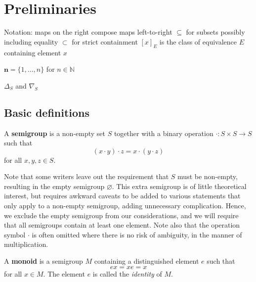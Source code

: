 \chapter{Preliminaries}
\label{chap:intro}


Notation:
maps on the right
compose maps left-to-right
$\subseteq$ for subsets possibly including equality
$\subset$ for strict containment
$[x]_E$ is the class of equivalence $E$ containing element $x$

$\mathbf{n} = \{1, \ldots, n\}$ for $n \in \mathbb{N}$

$\Delta_S$ and $\nabla_S$

\section{Basic definitions}
\label{sec:intro-basic}

\begin{definition}
  \label{def:semigroup}
  A \textbf{semigroup} is a non-empty set $S$ together with
  a binary operation $\cdot: S \times S \to S$ such that
  $$(x \cdot y) \cdot z = x \cdot (y \cdot z)$$
  for all $x, y, z \in S$.
\end{definition}
Note that some writers leave out the requirement that $S$ must be non-empty,
resulting in the empty semigroup $\varnothing$.  This extra semigroup is of
little theoretical interest, but requires awkward caveats to be added to various
statements that only apply to a non-empty semigroup, adding unnecessary
complication.  Hence, we exclude the empty semigroup from our considerations,
and we will require that all semigroups contain at least one element.  Note also
that the operation symbol $\cdot$ is often omitted where there is no risk of
ambiguity, in the manner of multiplication.

\begin{definition}
  \label{def:monoid}
  A \textbf{monoid} is a semigroup $M$ containing a distinguished element $e$
  such that
  $$ex = xe = x$$
  for all $x \in M$.  The element $e$ is called the \textit{identity} of $M$.
\end{definition}


